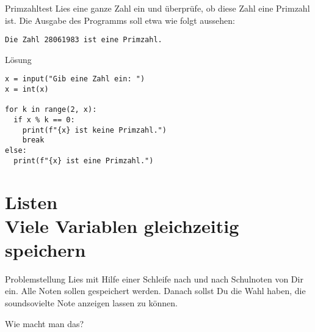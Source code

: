 \begin{fragile}
\begin{block}{Primzahltest}
\vspace{2pt}
Lies eine ganze Zahl  ein und überprüfe, ob diese Zahl eine Primzahl ist. Die Ausgabe des Programms soll etwa wie folgt aussehen:  

\texttt{Die Zahl 28061983 ist eine Primzahl.}
\end{block}

\vspace{12pt}
\begin{solutionblock}{Lösung}
\begin{verbatim}
x = input("Gib eine Zahl ein: ")
x = int(x)

for k in range(2, x):
  if x % k == 0:
    print(f"{x} ist keine Primzahl.")
    break
else:
  print(f"{x} ist eine Primzahl.")
\end{verbatim}
\end{solutionblock}

\end{fragile}







\section{Listen \\ \footnotesize Viele Variablen gleichzeitig speichern}


\begin{frame}
\begin{block}{Problemstellung}
\vspace{2pt}
Lies mit Hilfe einer Schleife nach und nach Schulnoten von Dir ein. 
Alle Noten sollen gespeichert werden. Danach sollst Du die Wahl haben, die soundsovielte Note anzeigen lassen zu können.   

\vspace{8pt}

Wie macht man das? 
\end{block}
\end{frame}

